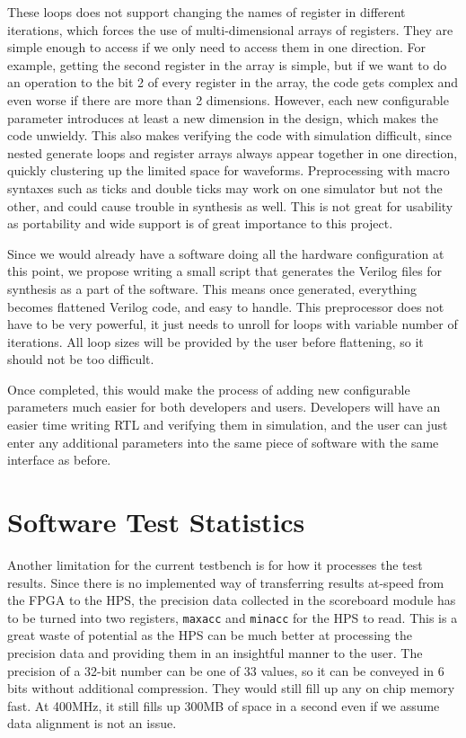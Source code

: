 These loops does not support changing the names of register in different iterations, which forces the use of multi-dimensional arrays of registers.
They are simple enough to access if we only need to access them in one direction.
For example, getting the second register in the array is simple, but if we want to do an operation to the bit 2 of every register in the array, the code gets complex and even worse if there are more than 2 dimensions.
However, each new configurable parameter introduces at least a new dimension in the design, which makes the code unwieldy.
This also makes verifying the code with simulation difficult, since nested generate loops and register arrays always appear together in one direction, quickly clustering up the limited space for waveforms.
Preprocessing with macro syntaxes such as ticks and double ticks may work on one simulator but not the other, and could cause trouble in synthesis as well.
This is not great for usability as portability and wide support is of great importance to this project.

Since we would already have a software doing all the hardware configuration at this point, we propose writing a small script that generates the Verilog files for synthesis as a part of the software.
This means once generated, everything becomes flattened Verilog code, and easy to handle.
This preprocessor does not have to be very powerful, it just needs to unroll for loops with variable number of iterations.
All loop sizes will be provided by the user before flattening, so it should not be too difficult.

Once completed, this would make the process of adding new configurable parameters much easier for both developers and users.
Developers will have an easier time writing RTL and verifying them in simulation, and the user can just enter any additional parameters into the same piece of software with the same interface as before.

\section{Software Test Statistics}

Another limitation for the current testbench is for how it processes the test results.
Since there is no implemented way of transferring results at-speed from the FPGA to the HPS, the precision data collected in the scoreboard module has to be turned into two registers, \texttt{maxacc} and \texttt{minacc} for the HPS to read.
This is a great waste of potential as the HPS can be much better at processing the precision data and providing them in an insightful manner to the user.
The precision of a 32-bit number can be one of 33 values, so it can be conveyed in 6 bits without additional compression.
They would still fill up any on chip memory fast.
At 400MHz, it still fills up 300MB of space in a second even if we assume data alignment is not an issue.

